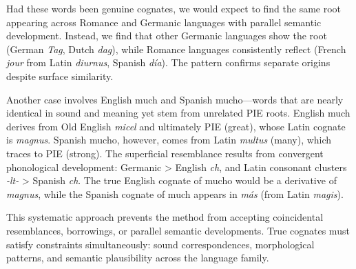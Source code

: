 Had these words been genuine cognates, we would expect to find the same root appearing across Romance and Germanic languages with parallel semantic development. Instead, we find that other Germanic languages show the  root (German \emph{Tag}, Dutch \emph{dag}), while Romance languages consistently reflect  (French \emph{jour} from Latin \emph{diurnus}, Spanish \emph{día}). The pattern confirms separate origins despite surface similarity.

Another case involves English \QSOpen{}much\QSClose{} and Spanish \QSOpen{}mucho\QSClose{}—words that are nearly identical in sound and meaning yet stem from unrelated PIE roots. English \QSOpen{}much\QSClose{} derives from Old English \emph{micel} and ultimately PIE  (\QSOpen{}great\QSClose{}), whose Latin cognate is \emph{magnus}. Spanish \QSOpen{}mucho,\QSClose{} however, comes from Latin \emph{multus} (\QSOpen{}many\QSClose{}), which traces to PIE  (\QSOpen{}strong\QSClose{}). The superficial resemblance results from convergent phonological development: Germanic  > English \emph{ch}, and Latin consonant clusters \emph{-lt-} > Spanish \emph{ch}. The true English cognate of \QSOpen{}mucho\QSClose{} would be a derivative of \emph{magnus}, while the Spanish cognate of \QSOpen{}much\QSClose{} appears in \emph{más} (from Latin \emph{magis}).

This systematic approach prevents the method from accepting coincidental resemblances, borrowings, or parallel semantic developments. True cognates must satisfy constraints simultaneously: sound correspondences, morphological patterns, and semantic plausibility across the language family. 

